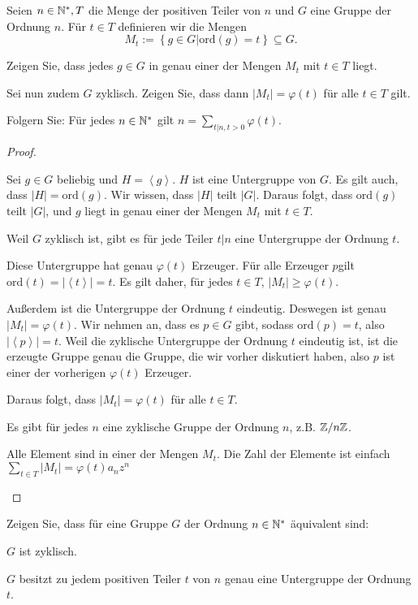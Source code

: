 \begin{Problem}
	Seien $n\in \mathbb{N}^*, T$ die Menge der positiven Teiler von $n$ und $G$ eine Gruppe der Ordnung $n$. F\"{u}r $t\in T$ definieren wir die Mengen
	\[
		M_t:=\left\{ g\in G|\text{ord}(g)=t \right\} \subseteq G
	.\] 
	\begin{parts}
		\item Zeigen Sie, dass jedes $g\in G$ in genau einer der Mengen $M_t$ mit $t\in T$ liegt.
		\item Sei nun zudem $G$ zyklisch. Zeigen Sie, dass dann $|M_t|=\varphi(t)$ f\"{u}r alle $t\in T$ gilt.
		\item Folgern Sie: F\"{u}r jedes $n\in \mathbb{N}^*$ gilt $n=\sum_{t|n, t>0}\varphi(t)$.
	\end{parts}
\end{Problem}
\begin{proof}
	\begin{parts}
	\item Sei $g\in G$ beliebig und $H=\left<g \right>$. $H$ ist eine Untergruppe von $G$. Es gilt auch, dass $|H|=\text{ord}(g)$. Wir wissen, dass $|H|$ teilt $|G|$. Daraus folgt, dass $\text{ord}(g)$ teilt $|G|$, und $g$ liegt in genau einer der Mengen $M_t$ mit $t\in T$.
	\item Weil $G$ zyklisch ist, gibt es f\"{u}r jede Teiler $t|n$ eine Untergruppe der Ordnung $t$. 

		Diese Untergruppe hat genau $\varphi(t)$ Erzeuger. F\"{u}r alle Erzeuger $p$gilt $\text{ord}(t)=|\left<t \right>|=t$. Es gilt daher, f\"{u}r jedes $t\in T$, $|M_t|\ge \varphi(t)$. 

		Außerdem ist die Untergruppe der Ordnung $t$ eindeutig. Deswegen ist genau $|M_t|=\varphi(t)$. Wir nehmen an, dass es $p\in G$ gibt, sodass $\text{ord}(p)=t$, also $|\left<p \right>|=t$. Weil die zyklische Untergruppe der Ordnung $t$ eindeutig ist, ist die erzeugte Gruppe genau die Gruppe, die wir vorher diskutiert haben, also $p$ ist einer der vorherigen $\varphi(t)$ Erzeuger.

		Daraus folgt, dass $|M_t|=\varphi(t)$ f\"{u}r alle $t\in T$.
	\item Es gibt f\"{u}r jedes $n$ eine zyklische Gruppe der Ordnung $n$, z.B. $\mathbb{Z} / n\mathbb{Z}$.

		Alle Element sind in einer der Mengen $M_t$. Die Zahl der Elemente ist einfach  $\sum_{t\in T} |M_t|=\varphi(t)a_n z^n$
	\end{parts}
\end{proof}
\begin{Problem}
	Zeigen Sie, dass für eine Gruppe $G$ der Ordnung $n \in \mathbb{N}^*$ äquivalent sind:
	\begin{parts}
	\item $G$ ist zyklisch.
	\item $G$ besitzt zu jedem positiven Teiler $t$ von $n$ genau eine Untergruppe der Ordnung $t$.
	\end{parts}
\end{Problem}
